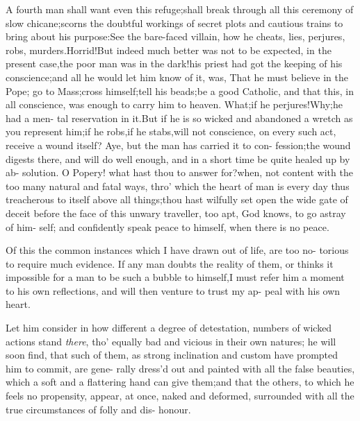 \documentclass{article}
\begin{document}
\lqq A fourth man shall want even this\break
\lqq refuge;\tsk shall break through all this\break
\lqq ceremony of slow chicane;\tsk scorns\break
\lqq the doubtful workings of secret plots\break
\lqq and cautious trains to bring about his\break
\lqq purpose:\tsh See the bare-faced villain,\break
\lqq how he cheats, lies, perjures, robs,\break
\lqq murders.\tsh Horrid!\tsh But indeed\break
\lqq much better was not to be expected,\break
\lqq in the present case,\tsk the poor man\break
\lqq was in the dark!\tsk his priest had got
\lqq the keeping of his conscience;\tsk and\break
\lqq all he would let him know of it, was,\break
\lqq That he must believe in the Pope;\tsk\break
\lqq go to Mass;\tsk cross himself;\tsk tell his\break
\lqq beads;\tsh be a good Catholic, and\break
\lqq that this, in all conscience, was enough\break
\lqq to carry him to heaven.  What;\tsk if\break
\lqq he perjures!\tsk Why;\tsk he had a men-\break
\lqq tal reservation in it.\tsk But if he is so\break
\lqq wicked and abandoned a wretch as\break
\lqq you represent him;\tsk if he robs,\tsk if\break
\lqq he stabs,\tsk will not conscience, on every 
\lqq such act, receive a wound itself? Aye,\break
\lqq \tsk but the man has carried it to con-\break
\lqq fession;\tsk the wound digests there,\break
\lqq and will do well enough, and in a\break
\lqq short time be quite healed up by ab-\break
\lqq solution. O Popery! what hast thou\break
\lqq to answer for?\tsk when, not content\break
\lqq with the too many natural and fatal\break
\lqq ways, thro’ which the heart of man is
\lqq every day thus treacherous to itself\break
\lqq above all things;\tsk thou hast wilfully\break
\lqq set open the wide gate of deceit before\break
\lqq the face of this unwary traveller, too\break
\lqq apt, God knows, to go astray of him-\break
\lqq self; and confidently speak peace to\break
\lqq himself, when there is no peace.

\lqq Of this the common instances which\break
\lqq I have drawn out of life, are too no-\break
\lqq torious to require much evidence. If\break
\lqq any man doubts the reality of them,\break
\lqq or thinks it impossible for a man to be\break
\lqq such a bubble to himself,\tsk I must refer\break
\lqq him a moment to his own reflections,\break
\lqq and will then venture to trust my ap-\break
\lqq peal with his own heart.  

\lqq Let him consider in how different\break
\lqq a degree of detestation, numbers of\break
\lqq wicked actions stand \textit{there}, tho’ equally
\lqq bad and vicious in their own natures;\break
\lqq \tsk he will soon find, that such of them,\break
\lqq as strong inclination and custom have\break
\lqq prompted him to commit, are gene-\break
\lqq rally dress’d out and painted with all\break
\lqq the false beauties, which a soft and a\break
\lqq flattering hand can give them;\tsk and\break
\lqq that the others, to which he feels no\break
\lqq propensity, appear, at once, naked and\break
\lqq deformed, surrounded with all the\break
\lqq true circumstances of folly and dis-\break
\lqq honour.
\end{document}
